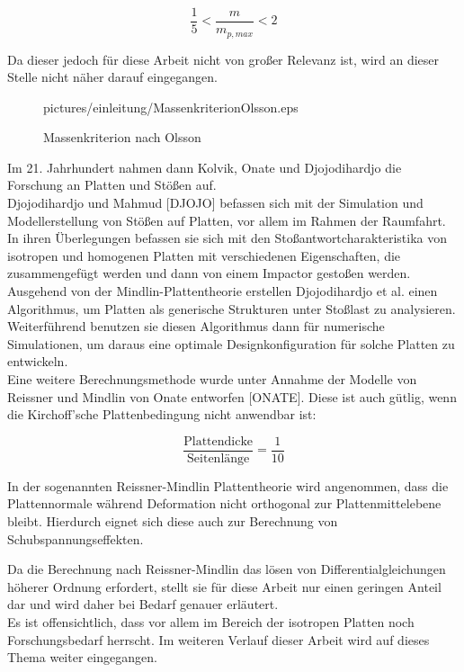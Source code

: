 \begin{equation}
	\frac{1}{5} < \frac{m}{m_{p,max}} < 2
\end{equation}

Da dieser jedoch für diese Arbeit nicht von großer Relevanz ist, wird an dieser Stelle nicht näher darauf eingegangen.\\

\begin{figure}
	\begin{center}
		\begin{overpic}[width=\linewidth]{pictures/einleitung/MassenkriterionOlsson.eps}
					
		\end{overpic}	
		\caption{Massenkriterion nach Olsson}	
		\label{fig:Olsson}
	\end{center}
\end{figure}


Im 21. Jahrhundert nahmen dann Kolvik, Onate und Djojodihardjo die Forschung an Platten und Stößen auf.\\
Djojodihardjo und Mahmud [DJOJO] befassen sich mit der Simulation und Modellerstellung von Stößen auf Platten, vor allem im Rahmen der Raumfahrt. In ihren Überlegungen befassen sie sich mit den Stoßantwortcharakteristika von isotropen und homogenen Platten mit verschiedenen Eigenschaften, die zusammengefügt werden und dann von einem Impactor gestoßen werden. Ausgehend von der Mindlin-Plattentheorie erstellen Djojodihardjo et al. einen Algorithmus, um Platten als generische Strukturen unter Stoßlast zu analysieren. Weiterführend benutzen sie diesen Algorithmus dann für numerische Simulationen, um daraus eine optimale Designkonfiguration für solche Platten zu entwickeln.\\
Eine weitere Berechnungsmethode wurde unter Annahme der Modelle von Reissner und Mindlin von Onate entworfen [ONATE]. Diese ist auch gütlig, wenn die Kirchoff'sche Plattenbedingung nicht anwendbar ist:

\begin{equation}
\frac{\mbox{Plattendicke}}{\mbox{Seitenlänge}} = \frac{1}{10}
\end{equation}

In der sogenannten Reissner-Mindlin Plattentheorie wird angenommen, dass die Plattennormale während Deformation nicht orthogonal zur Plattenmittelebene
bleibt. Hierdurch eignet sich diese auch zur Berechnung von Schubspannungseffekten.

Da die Berechnung nach Reissner-Mindlin das lösen von Differentialgleichungen höherer Ordnung erfordert, stellt sie für diese Arbeit nur einen geringen Anteil
dar und wird daher bei Bedarf genauer erläutert.\\

Es ist offensichtlich, dass vor allem im Bereich der isotropen Platten noch Forschungsbedarf herrscht. Im weiteren Verlauf dieser Arbeit wird auf dieses Thema weiter eingegangen.\\




